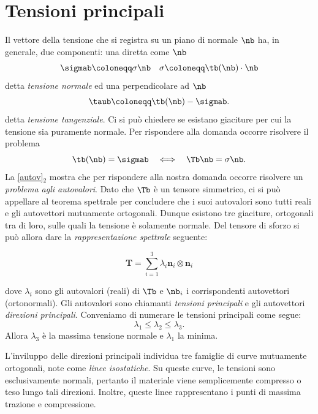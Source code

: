 \section{Tensioni principali}
Il vettore della tensione che si registra su un piano di normale $\nb$ ha, in generale, due componenti: una diretta come $\nb$ 
\begin{equation}
\sigmab\coloneqq\sigma\nb \quad\sigma\coloneqq \tb(\nb) \cdot \nb
\end{equation}
detta \textit{tensione normale} ed una perpendicolare ad $\nb$
\begin{equation}
\taub\coloneqq \tb(\nb) -\sigmab.
\end{equation}
detta \textit{tensione tangenziale}. Ci si può chiedere se esistano giaciture per cui la tensione sia puramente normale. Per rispondere alla domanda occorre risolvere il problema
\begin{equation}\label{autov}
	\tb(\nb)=\sigmab \quad  \Longleftrightarrow\quad \Tb \nb =\sigma \nb.
\end{equation} 
La \eqref{autov}$_2$ mostra che per rispondere alla nostra domanda occorre risolvere un \textit{problema agli autovalori}. Dato che $\Tb$ è un tensore simmetrico, ci si può appellare al teorema spettrale per concludere che i suoi autovalori sono tutti reali e gli autovettori mutuamente ortogonali. Dunque esistono tre giaciture, ortogonali tra di loro, sulle quali la tensione è solamente normale. Del tensore di sforzo si può allora dare la \textit{rappresentazione spettrale} seguente:
\begin{definition}
	\begin{equation}
	\mathbf{T}=\sum_{i=1}^3\lambda_i\mathbf{n}_i\otimes\mathbf{n}_i
\end{equation}
\end{definition}
dove $\lambda_i$ sono gli autovalori (reali) di $\Tb$ e $\nb_i$ i corrispondenti autovettori (ortonormali). Gli autovalori sono chiamanti \textit{tensioni principali} e gli autovettori \textit{direzioni principali}. Conveniamo di numerare le tensioni principali come segue:
\begin{equation}
	\lambda_1\leq\lambda_2\leq\lambda_3.
\end{equation}
Allora $\lambda_3$ è la massima tensione normale e $\lambda_1$ la minima.

L'inviluppo delle direzioni principali individua tre famiglie di curve mutuamente ortogonali, note come \textit{linee isostatiche}. Su queste curve, le tensioni sono esclusivamente normali, pertanto il materiale viene semplicemente compresso o teso lungo tali direzioni. Inoltre, queste linee rappresentano i punti di massima trazione e compressione.

